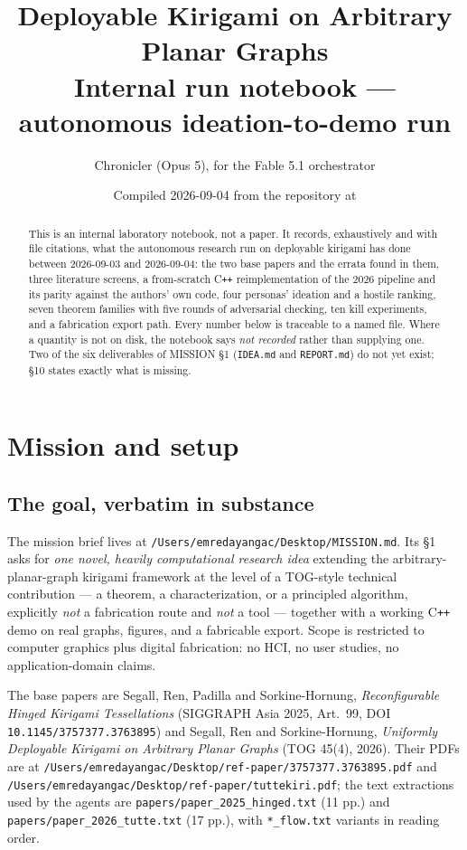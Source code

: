 \documentclass[10pt,a4paper]{article}
\title{\bf Deployable Kirigami on Arbitrary Planar Graphs\\[2mm]
\large Internal run notebook --- autonomous ideation-to-demo run}
\author{Chronicler (Opus 5), for the Fable 5.1 orchestrator}
\date{Compiled 2026-09-04 from the repository at\\ \fn{/Users/emredayangac/Documents/kirigami-experiments}}
\newcommand{\fn}[1]{\nolinkurl{#1}}
\newcommand{\NR}{\emph{not recorded}}
\begin{document}
\maketitle

\begin{abstract}
\noindent
This is an internal laboratory notebook, not a paper. It records, exhaustively and with file
citations, what the autonomous research run on deployable kirigami has done between
2026-09-03 and 2026-09-04: the two base papers and the errata found in them, three literature
screens, a from-scratch C\texttt{++} reimplementation of the 2026 pipeline and its parity against the
authors' own code, four personas' ideation and a hostile ranking, seven theorem families with
five rounds of adversarial checking, ten kill experiments, and a fabrication export path.
Every number below is traceable to a named file. Where a quantity is not on disk, the notebook
says \NR{} rather than supplying one. Two of the six deliverables of MISSION \S1
(\fn{IDEA.md} and \fn{REPORT.md}) do not yet exist; \S10 states exactly what is missing.
\end{abstract}

\tableofcontents
\newpage

\section{Mission and setup}

\subsection{The goal, verbatim in substance}

The mission brief lives at \fn{/Users/emredayangac/Desktop/MISSION.md}. Its \S1 asks for
\emph{one novel, heavily computational research idea} extending the arbitrary-planar-graph
kirigami framework at the level of a TOG-style technical contribution --- a theorem, a
characterization, or a principled algorithm, explicitly \emph{not} a fabrication route and
\emph{not} a tool --- together with a working C\texttt{++} demo on real graphs, figures, and a
fabricable export. Scope is restricted to computer graphics plus digital fabrication: no HCI,
no user studies, no application-domain claims.

The base papers are Segall, Ren, Padilla and Sorkine-Hornung, \emph{Reconfigurable Hinged
Kirigami Tessellations} (SIGGRAPH Asia 2025, Art.~99, DOI \fn{10.1145/3757377.3763895}) and
Segall, Ren and Sorkine-Hornung, \emph{Uniformly Deployable Kirigami on Arbitrary Planar
Graphs} (TOG 45(4), 2026). Their PDFs are at
\fn{/Users/emredayangac/Desktop/ref-paper/3757377.3763895.pdf} and
\fn{/Users/emredayangac/Desktop/ref-paper/tuttekiri.pdf}; the text extractions used by the
agents are \fn{papers/paper_2025_hinged.txt} (11 pp.) and \fn{papers/paper_2026_tutte.txt}
(17 pp.), with \fn{*_flow.txt} variants in reading order.
\end{document}
